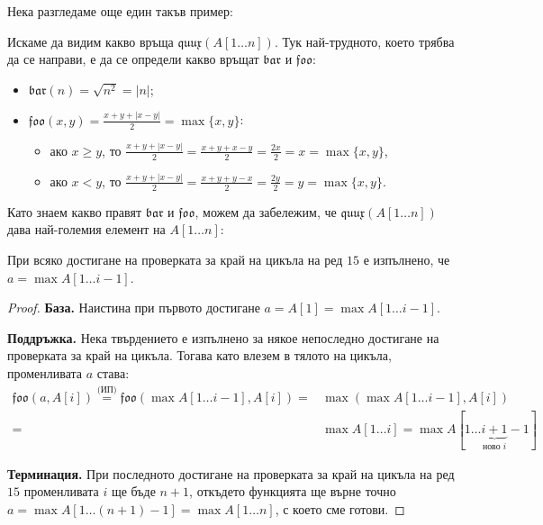 \newpage

Нека разгледаме още един такъв пример:


Искаме да видим какво връща $\mathfrak{quux}(A[1 \dots n])$.
Тук най-трудното, което трябва да се направи, е да се определи какво връщат $\mathfrak{bar}$ и $\mathfrak{foo}$:
\begin{itemize}
    \item $\mathfrak{bar}(n) = \sqrt{n ^ 2} = | n |$;
    \item $\mathfrak{foo}(x, y) = \frac{x + y + |x - y|}{2}  = \max\{ x, y \}$:
          \begin{itemize}
              \item ако $x \geq y$, то $\frac{x + y + |x - y|}{2} = \frac{x + y + x - y}{2} = \frac{2x}{2} = x = \max\{ x, y \}$,
              \item ако $x < y$, то $\frac{x + y + |x - y|}{2} = \frac{x + y + y - x}{2} = \frac{2y}{2} = y = \max\{ x, y \}$.
          \end{itemize}
\end{itemize}

Като знаем какво правят $\mathfrak{bar}$ и $\mathfrak{foo}$, можем да забележим, че $\mathfrak{quux}(A[1 \dots n])$ дава най-големия елемент на $A[1 \dots n]$:
\begin{invariant}
    При всяко достигане на проверката за край на цикъла на ред $15$ е изпълнено, че $a = \max A[1 \dots i - 1]$.
\end{invariant}

\begin{proof}
    \phantom{1}

    \textbf{База.}
    Наистина при първото достигане $a = A[1] = \max A[1 \dots i - 1]$.

    \textbf{Поддръжка.}
    Нека твърдението е изпълнено за някое непоследно достигане на проверката за край на цикъла.
    Тогава като влезем в тялото на цикъла, променливата $a$ става:
    \begin{align*}
        \mathfrak{foo}(a, A[i])  \stackrel{\text{(ИП)}}{=} \mathfrak{foo}(\max A[1 \dots i - 1], A[i]) = & \max (\max A[1 \dots i - 1], A[i])                                          \\
        =                                                                                                & \max A[1 \dots i] = \max A[1 \dots \underbrace{i + 1}_{\text{ново } i} - 1]
    \end{align*}

    \textbf{Терминация.}
    При последното достигане на проверката за край на цикъла на ред $15$ променливата $i$ ще бъде $n + 1$, откъдето функцията ще върне точно $a = \max A[1 \dots (n + 1) - 1] = \max A[1 \dots n]$, с което сме готови.
\end{proof}
